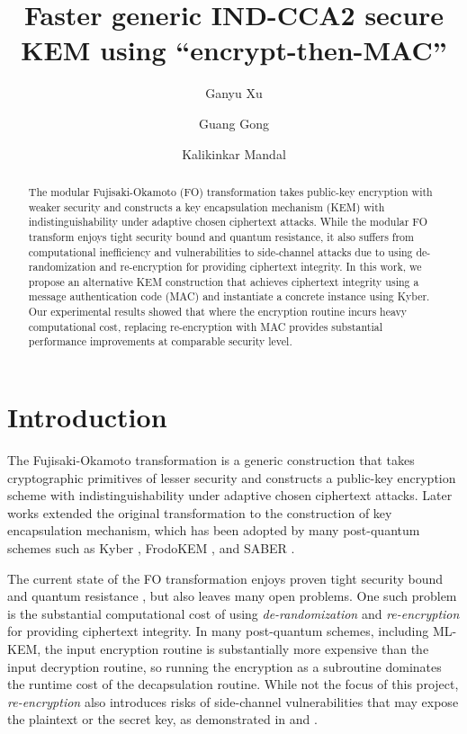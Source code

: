 \documentclass[journal=tches,submission]{iacrtrans}
\author{
    Ganyu Xu\inst{1}
    \and Guang Gong\inst{1}
    \and Kalikinkar Mandal\inst{2}
}
\institute{
  University of Waterloo, Waterloo, Canada, \email{{g66xu,ggong}@uwaterloo.ca}
  \and
  University of New Brunswick, New Brunswick, Canada, \email{kmandal@unb.ca}
}
\title{
Faster generic IND-CCA2 secure KEM using ``encrypt-then-MAC''}
\begin{document}
\maketitle




\begin{abstract}
  The modular Fujisaki-Okamoto (FO) transformation takes public-key encryption with weaker security and constructs a key encapsulation mechanism (KEM) with indistinguishability under adaptive chosen ciphertext attacks. While the modular FO transform enjoys tight security bound and quantum resistance, it also suffers from computational inefficiency and vulnerabilities to side-channel attacks due to using de-randomization and re-encryption for providing ciphertext integrity. In this work, we propose an alternative KEM construction that achieves ciphertext integrity using a message authentication code (MAC) and instantiate a concrete instance using Kyber. Our experimental results showed that where the encryption routine incurs heavy computational cost, replacing re-encryption with MAC provides substantial performance improvements at comparable security level.
\end{abstract}


\section{Introduction}
The Fujisaki-Okamoto transformation \cite{fujisaki1999secure} is a generic construction that takes cryptographic primitives of lesser security and constructs a public-key encryption scheme with indistinguishability under adaptive chosen ciphertext attacks. Later works \cite{hofheinz2017modular} extended the original transformation to the construction of key encapsulation mechanism, which has been adopted by many post-quantum schemes such as Kyber \cite{bos2018crystals}, FrodoKEM \cite{bos2016frodo}, and SABER \cite{d2018saber}.

The current state of the FO transformation enjoys proven tight security bound and quantum resistance \cite{hofheinz2017modular}, but also leaves many open problems. One such problem is the substantial computational cost of using \emph{de-randomization} and \emph{re-encryption} \cite{bernstein2018towards} for providing ciphertext integrity. In many post-quantum schemes, including ML-KEM, the input encryption routine is substantially more expensive than the input decryption routine, so running the encryption as a subroutine dominates the runtime cost of the decapsulation routine. While not the focus of this project, \emph{re-encryption} also introduces risks of side-channel vulnerabilities that may expose the plaintext or the secret key, as demonstrated in \cite{ravi2019generic} and \cite{ueno2022curse}.
\end{document}
